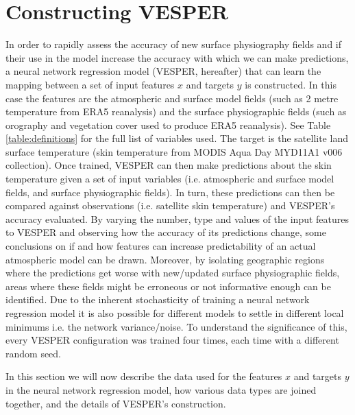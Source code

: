 \documentclass[hess, twostagejnl]{copernicus}
\begin{document}
\section{Constructing VESPER}\label{sec:2}
In order to rapidly assess the accuracy of new surface physiography fields and if their use in the model increase the accuracy with which we can make predictions, a neural network regression model (VESPER, hereafter) that can learn the mapping between a set of input features $x$ and targets $y$ is constructed. In this case the features are the atmospheric and surface model fields (such as 2 metre temperature from ERA5 reanalysis) and the surface physiographic fields (such as orography and vegetation cover used to produce ERA5 reanalysis). See Table \ref{table:definitions} for the full list of variables used. The target is the satellite land surface temperature (skin temperature from MODIS Aqua Day MYD11A1 v006 collection). Once trained, VESPER can then make predictions about the skin temperature given a set of input variables (i.e. atmospheric and surface model fields, and surface physiographic fields). In turn, these predictions can then be compared against observations (i.e. satellite skin temperature) and VESPER's accuracy evaluated. By varying the number, type and values of the input features to VESPER and observing how the accuracy of its predictions change, some conclusions on if and how features can increase predictability of an actual atmospheric model can be drawn. Moreover, by isolating geographic regions where the predictions get worse with new/updated surface physiographic fields, areas where these fields might be erroneous or not informative enough can be identified. Due to the inherent stochasticity of training a neural network regression model it is also possible for different models to settle in different local minimums i.e. the network variance/noise. To understand the significance of this, every VESPER configuration was trained four times, each time with a different random seed. \newline 
	

\noindent In this section we will now describe the data used for the features $x$ and targets $y$ in the neural network regression model, how various data types are joined together, and the details of VESPER’s construction.
\end{document}
